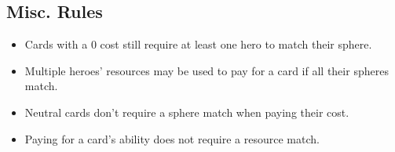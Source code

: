 \documentclass[12pt]{article}
\newenvironment{itemizeCustom}
{\begin{itemize}
  \setlength{\itemsep}{1pt}
  \setlength{\parskip}{0pt}
  \setlength{\parsep}{0pt}}
{\end{itemize}}
\begin{document}
\begin{multicols*}{2}
\section*{Misc. Rules}
\begin{itemizeCustom}
	\item Cards with a 0 cost still require at least one hero to match their sphere.
	\item Multiple heroes' resources may be used to pay for a card if all their spheres match.
	\item Neutral cards don't require a sphere match when paying their cost.
	\item Paying for a card's ability does not require a resource match.
\end{itemizeCustom}


\end{multicols*}
\end{document}

